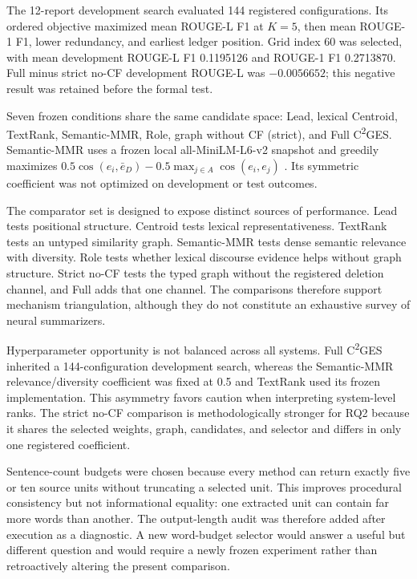 \documentclass[applsci,article,submit,moreauthors]{Definitions/mdpi}
\newcommand{\cges}{C\textsuperscript{2}GES}
\begin{document}
The 12-report development search evaluated 144 registered configurations. Its ordered objective maximized mean ROUGE-L F1 at $K=5$, then mean ROUGE-1 F1, lower redundancy, and earliest ledger position. Grid index 60 was selected, with mean development ROUGE-L F1 0.1195126 and ROUGE-1 F1 0.2713870. Full minus strict no-CF development ROUGE-L was $-0.0056652$; this negative result was retained before the formal test.

Seven frozen conditions share the same candidate space: Lead, lexical Centroid, TextRank, Semantic-MMR, Role, graph without CF (strict), and Full \cges{}. Semantic-MMR uses a frozen local all-MiniLM-L6-v2 snapshot and greedily maximizes $0.5\cos(e_i,\bar e_D)-0.5\max_{j\in A}\cos(e_i,e_j)$ \cite{reimers2019sentencebert}. Its symmetric coefficient was not optimized on development or test outcomes.

The comparator set is designed to expose distinct sources of performance. Lead tests positional structure. Centroid tests lexical representativeness. TextRank tests an untyped similarity graph. Semantic-MMR tests dense semantic relevance with diversity. Role tests whether lexical discourse evidence helps without graph structure. Strict no-CF tests the typed graph without the registered deletion channel, and Full adds that one channel. The comparisons therefore support mechanism triangulation, although they do not constitute an exhaustive survey of neural summarizers.

Hyperparameter opportunity is not balanced across all systems. Full \cges{} inherited a 144-configuration development search, whereas the Semantic-MMR relevance/diversity coefficient was fixed at 0.5 and TextRank used its frozen implementation. This asymmetry favors caution when interpreting system-level ranks. The strict no-CF comparison is methodologically stronger for RQ2 because it shares the selected weights, graph, candidates, and selector and differs in only one registered coefficient.

Sentence-count budgets were chosen because every method can return exactly five or ten source units without truncating a selected unit. This improves procedural consistency but not informational equality: one extracted unit can contain far more words than another. The output-length audit was therefore added after execution as a diagnostic. A new word-budget selector would answer a useful but different question and would require a newly frozen experiment rather than retroactively altering the present comparison.
\end{document}
